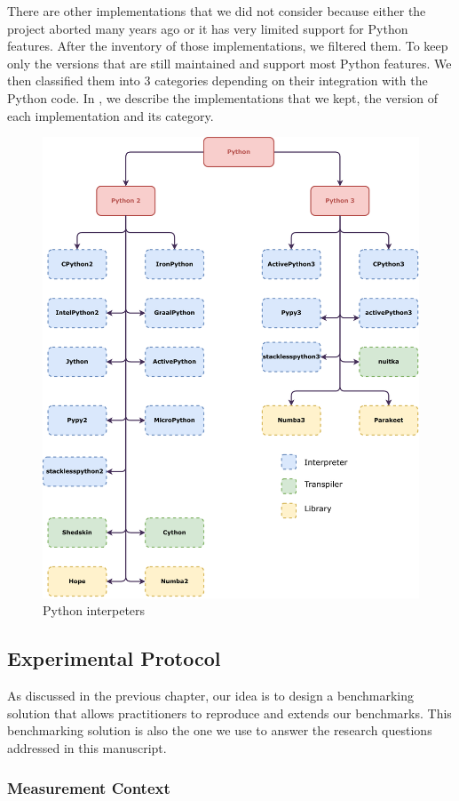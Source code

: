 There are other implementations that we did not consider because either the project aborted many years ago or it has very limited support for Python features.
After the inventory of those implementations, we filtered them.
To keep only the versions that are still maintained and support most Python features.
We then classified them into 3 categories depending on their integration with the Python code.
In , we describe the implementations that we kept, the version of each implementation and its category.

\begin{figure}
      \centering
      \includegraphics[width=.7\linewidth]{imgs/python-implementations-tree}
      \caption{Python interpeters}
      \label{fig:interpreters}
\end{figure}



\subsection{Experimental Protocol}
As discussed in the previous chapter, our idea is to design a benchmarking solution that allows practitioners to reproduce and extends our benchmarks.
This benchmarking solution is also the one we use to answer the research questions addressed in this manuscript.

\subsubsection{Measurement Context}
